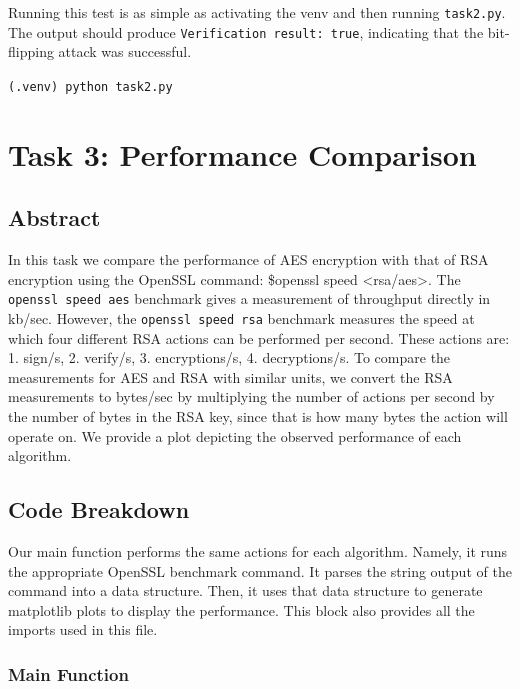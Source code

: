 \documentclass[11pt]{article}
\begin{document}
Running this test is as simple as activating the venv and then running \verb|task2.py|. The output should produce \verb|Verification result: true|, indicating that the bit-flipping attack was successful.

\verb|(.venv) python task2.py|

\section*{Task 3: Performance Comparison}
\subsection*{Abstract}

In this task we compare the performance of AES encryption with that of RSA encryption using the OpenSSL command: \$openssl speed <rsa/aes>. The \verb|openssl speed aes| benchmark gives a measurement of throughput directly in kb/sec. However, the \verb|openssl speed rsa| benchmark measures the speed at which four different RSA actions can be performed per second. These actions are: 1. sign/s, 2. verify/s, 3. encryptions/s, 4. decryptions/s. To compare the measurements for AES and RSA with similar units, we convert the RSA measurements to bytes/sec by multiplying the number of actions per second by the number of bytes in the RSA key, since that is how many bytes the action will operate on. We provide a plot depicting the observed performance of each algorithm.

\subsection*{Code Breakdown}
Our main function performs the same actions for each algorithm. Namely, it runs the appropriate OpenSSL benchmark command. It parses the string output of the command into a data structure. Then, it uses that data structure to generate matplotlib plots to display the performance. This block also provides all the imports used in this file.

\subsubsection*{Main Function}
\end{document}
